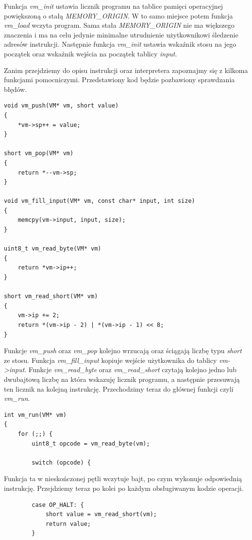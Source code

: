 \documentclass[language=polish,type=eng]{aghmodern}
\begin{document}
Funkcja \emph{vm\_init} ustawia licznik programu na tablice pamięci operacyjnej powiększoną o stałą
\emph{MEMORY\_ORIGIN}. W to samo miejsce potem funkcja \emph{vm\_load} wczyta program. Sama stała
\emph{MEMORY\_ORIGIN} nie ma większego znaczenia i ma na celu jedynie minimalne utrudnienie użytkownikowi
śledzenie adresów instrukcji. Następnie funkcja \emph{vm\_init} ustawia wskaźnik stosu na jego początek
oraz wskaźnik wejścia na początek tablicy \emph{input}.

Zanim przejdziemy do opisu instrukcji oraz interpretera zapoznajmy się z kilkoma funkcjami pomocniczymi.
Przedstawiony kod będzie pozbawiony sprawdzania błędów.

\begin{verbatim}
void vm_push(VM* vm, short value)
{
    *vm->sp++ = value;
}

short vm_pop(VM* vm)
{
    return *--vm->sp;
}

void vm_fill_input(VM* vm, const char* input, int size)
{
    memcpy(vm->input, input, size);
}

uint8_t vm_read_byte(VM* vm)
{
    return *vm->ip++;
}

short vm_read_short(VM* vm)
{
    vm->ip += 2;
    return *(vm->ip - 2) | *(vm->ip - 1) << 8;
}
\end{verbatim}

Funkcje \emph{vm\_push} oraz \emph{vm\_pop} kolejno wrzucają oraz ściągają liczbę typu \emph{short} ze stosu.
Funkcja \emph{vm\_fill\_input} kopiuje wejście użytkownika do tablicy \emph{vm->input}.
Funkcje \emph{vm\_read\_byte} oraz \emph{vm\_read\_short} czytają kolejno jedno lub dwubajtową liczbę
na która wskazuję licznik programu, a następnie przesuwają ten licznik na kolejną instrukcję.
Przechodzimy teraz do głównej funkcji czyli \emph{vm\_run}.

\begin{verbatim}
int vm_run(VM* vm)
{
    for (;;) {
        uint8_t opcode = vm_read_byte(vm);

        switch (opcode) {
\end{verbatim}

Funkcja ta w nieskończonej pętli wczytuje bajt, po czym wykonuje odpowiednią instrukcję.
Przejdziemy teraz po kolei po każdym obsługiwanym kodzie operacji.

\begin{verbatim}
        case OP_HALT: {
            short value = vm_read_short(vm);
            return value;
        }
\end{verbatim}
\end{document}

